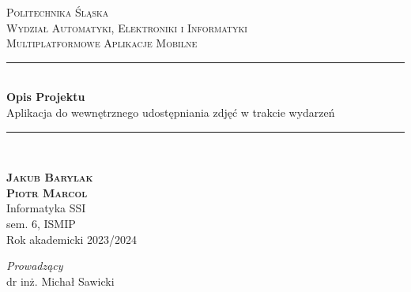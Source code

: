 \begin{titlepage} %
    \newcommand{\HRule}{\rule{\linewidth}{0.5mm}} %

    \center %


    \textsc{\LARGE Politechnika Śląska}\\[0.5cm] %

    \textsc{\Large Wydział Automatyki, Elektroniki i Informatyki}\\[1cm] %

    \textsc{\large Multiplatformowe Aplikacje Mobilne}\\[0.5cm] %


    \HRule\\[0.4cm]

    { {\Huge\bfseries Opis Projektu}\\[0.2cm] {\Large Aplikacja do wewnętrznego udostępniania zdjęć w trakcie wydarzeń}}\\[0.2cm] %

    \HRule\\[1.5cm]


    \begin{minipage}{0.5\textwidth}
        \begin{flushleft}
            \textsc{\bfseries
                Jakub Barylak
                \\Piotr Marcol}\\
            Informatyka SSI
            \\sem. 6, ISMIP\\
            Rok akademicki 2023/2024
        \end{flushleft}
    \end{minipage}
    \begin{minipage}{0.4\textwidth}
        \begin{flushright}
            \textit{Prowadzący}\\
            dr inż. Michał Sawicki
        \end{flushright}
    \end{minipage}




\end{titlepage}
